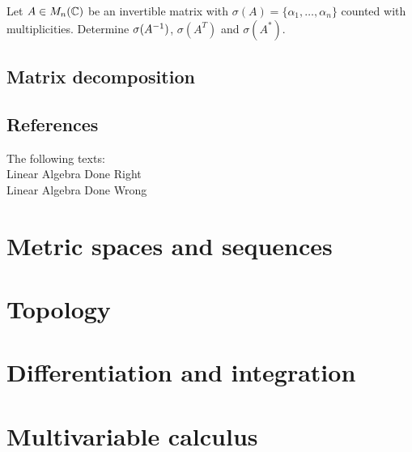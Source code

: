 \documentclass{article}
\begin{document}
\begin{exercise}
Let $A\in M_n({\mathbb{C}})$ be an invertible matrix with $\sigma(A) = \{\alpha_1,\ldots, \alpha_n\}$ counted with multiplicities. Determine $\sigma(A^{-1})$, $\sigma(A^T)$ and $\sigma(A^*)$.
\end{exercise}


\subsection{Matrix decomposition}


\subsection{References}
The following texts: \\
Linear Algebra Done Right \cite{linalgright} \\
Linear Algebra Done Wrong \cite{linalgwrong}



\section{Metric spaces and sequences}

\section{Topology}

\section{Differentiation and integration}

\section{Multivariable calculus}


\newpage

\printbibliography
\end{document}
